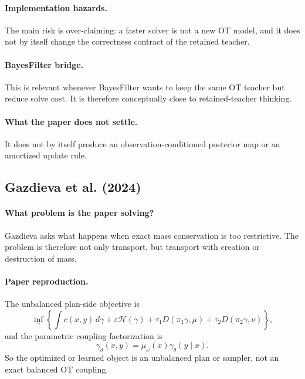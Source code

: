 \documentclass[11pt]{report}
\begin{document}
\paragraph{Implementation hazards.}
The main risk is over-claiming: a faster solver is not a new OT model, and it does
not by itself change the correctness contract of the retained teacher.

\paragraph{BayesFilter bridge.}
This is relevant whenever BayesFilter wants to keep the same OT teacher but reduce
solve cost.  It is therefore conceptually close to retained-teacher thinking.

\paragraph{What the paper does not settle.}
It does not by itself produce an observation-conditioned posterior map or an
amortized update rule.

\subsection*{Gazdieva et al. (2024)}

\paragraph{What problem is the paper solving?}
Gazdieva asks what happens when exact mass conservation is too restrictive.  The
problem is therefore not only transport, but transport with creation or destruction
of mass.

\paragraph{Paper reproduction.}
The unbalanced plan-side objective is
\begin{equation}
\inf_{\gamma}
\left\{
\int c(x,y)\,d\gamma
+\varepsilon\mathcal H(\gamma)
+\tau_1 D(\pi_1\gamma,\mu)
+\tau_2 D(\pi_2\gamma,\nu)
\right\},
\label{eq:gazdieva-ueot}
\end{equation}
and the parametric coupling factorization is
\begin{equation}
\gamma_\theta(x,y)=\mu_\omega(x)\gamma_\theta(y\mid x).
\label{eq:gazdieva-factorization}
\end{equation}
So the optimized or learned object is an unbalanced plan or sampler, not an exact
balanced OT coupling.
\end{document}
